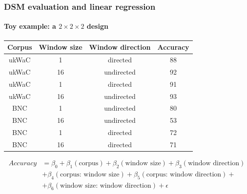 \documentclass[t]{beamer} %
\begin{document}
\begin{frame}
  \frametitle{DSM evaluation and linear regression}
  \framesubtitle{Toy example: a $2 \times 2 \times 2$ design}
  \centering
  \footnotesize
  \begin{tabular}{cccc}
    \hline
    Corpus & Window size &  Window direction &  Accuracy  \\  
    \hline 
    ukWaC & 1 & directed  &  88  \\  
    ukWaC & 16 & undirected   & 92 \\
    ukWaC & 1 & directed  &  91  \\  
    ukWaC & 16 & undirected   & 93 \\    
    BNC & 1  & undirected  &  80  \\  
    BNC & 16  & undirected  & 53   \\ 
    BNC & 1  & directed  &  72  \\  
    BNC & 16  & directed  & 71 \\   
    \hline
  \end{tabular}

  \begin{block}{}\small\ungap[2]
    \begin{align*}
      Accuracy &= \beta_{0} + \beta_1(\text{corpus})  + \beta_2(\text{window size}) +  \beta_3(\text{window direction}) \\
      & + \beta_4(\text{corpus: window size}) + \beta_5(\text{corpus: window direction}) + \\
      & + \beta_6(\text{window size: window direction})  + \epsilon
    \end{align*}
    \ungap[1.5]
  \end{block}
  
  \raggedright
\end{frame}
\end{document}
